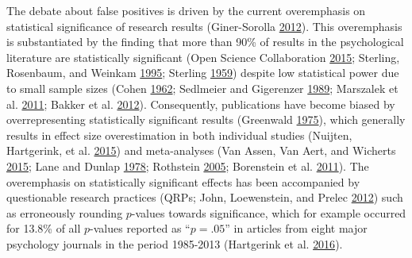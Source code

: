 \documentclass[a5paper]{book}
\begin{document}
The debate about false positives is driven by the current overemphasis
on statistical significance of research results (Giner-Sorolla
\protect\hyperlink{ref-doi:10.1177ux2f1745691612457576}{2012}). This
overemphasis is substantiated by the finding that more than 90\% of
results in the psychological literature are statistically significant
(Open Science Collaboration
\protect\hyperlink{ref-doi:10.1126ux2fscience.aac4716}{2015}; Sterling,
Rosenbaum, and Weinkam
\protect\hyperlink{ref-doi:10.2307ux2f2684823}{1995}; Sterling
\protect\hyperlink{ref-doi:10.2307ux2f2282137}{1959}) despite low
statistical power due to small sample sizes (Cohen
\protect\hyperlink{ref-doi:10.1037ux2fh0045186}{1962}; Sedlmeier and
Gigerenzer
\protect\hyperlink{ref-doi:10.1037ux2f0033-2909.105.2.309}{1989};
Marszalek et al.
\protect\hyperlink{ref-doi:10.2466ux2f03.11.pms.112.2.331-348}{2011};
Bakker et al.
\protect\hyperlink{ref-doi:10.1177ux2f1745691612459060}{2012}).
Consequently, publications have become biased by overrepresenting
statistically significant results (Greenwald
\protect\hyperlink{ref-doi:10.1037ux2fh0076157}{1975}), which generally
results in effect size overestimation in both individual studies
(Nuijten, Hartgerink, et al.
\protect\hyperlink{ref-doi:10.3758ux2fs13428-015-0664-2}{2015}) and
meta-analyses (Van Assen, Van Aert, and Wicherts
\protect\hyperlink{ref-doi:10.1037ux2fmet0000025}{2015}; Lane and Dunlap
\protect\hyperlink{ref-doi:10.1111ux2fj.2044-8317.1978.tb00578.x}{1978};
Rothstein \protect\hyperlink{ref-isbn:9780470870150}{2005}; Borenstein
et al. \protect\hyperlink{ref-isbn:9781119964377}{2011}). The
overemphasis on statistically significant effects has been accompanied
by questionable research practices (QRPs; John, Loewenstein, and Prelec
\protect\hyperlink{ref-doi:10.1177ux2f0956797611430953}{2012}) such as
erroneously rounding \(p\)-values towards significance, which for
example occurred for 13.8\% of all \(p\)-values reported as
\enquote{\(p =.05\)} in articles from eight major psychology journals in
the period 1985-2013 (Hartgerink et al.
\protect\hyperlink{ref-doi:10.7717ux2fpeerj.1935}{2016}).
\end{document}

